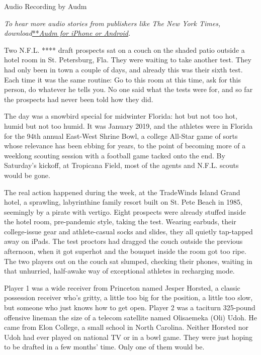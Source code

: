 Audio Recording by Audm

\emph{To hear more audio stories from publishers like The New York
Times,
download}\href{https://www.audm.com/?utm_source=nytmag\&utm_medium=embed\&utm_campaign=left_behind_draper}{**}\href{https://www.audm.com/?utm_source=nytmag\&utm_medium=embed\&utm_campaign=athletic_intelligence_measured_gordon}{\emph{Audm
for iPhone or Android}}\emph{.}

Two N.F.L. **** draft prospects sat on a couch on the shaded patio
outside a hotel room in St. Petersburg, Fla. They were waiting to take
another test. They had only been in town a couple of days, and already
this was their sixth test. Each time it was the same routine: Go to this
room at this time, ask for this person, do whatever he tells you. No one
said what the tests were for, and so far the prospects had never been
told how they did.

The day was a snowbird special for midwinter Florida: hot but not too
hot, humid but not too humid. It was January 2019, and the athletes were
in Florida for the 94th annual East-West Shrine Bowl, a college All-Star
game of sorts whose relevance has been ebbing for years, to the point of
becoming more of a weeklong scouting session with a football game tacked
onto the end. By Saturday's kickoff, at Tropicana Field, most of the
agents and N.F.L. scouts would be gone.

The real action happened during the week, at the TradeWinds Island Grand
hotel, a sprawling, labyrinthine family resort built on St. Pete Beach
in 1985, seemingly by a pirate with vertigo. Eight prospects were
already stuffed inside the hotel room, pre-pandemic style, taking the
test. Wearing earbuds, their college-issue gear and athlete-casual socks
and slides, they all quietly tap-tapped away on iPads. The test proctors
had dragged the couch outside the previous afternoon, when it got
superhot and the bouquet inside the room got too ripe. The two players
out on the couch sat slumped, checking their phones, waiting in that
unhurried, half-awake way of exceptional athletes in recharging mode.

Player 1 was a wide receiver from Princeton named Jesper Horsted, a
classic possession receiver who's gritty, a little too big for the
position, a little too slow, but someone who just knows how to get open.
Player 2 was a taciturn 325-pound offensive lineman the size of a
telecom satellite named Olisaemeka (Oli) Udoh. He came from Elon
College, a small school in North Carolina. Neither Horsted nor Udoh had
ever played on national TV or in a bowl game. They were just hoping to
be drafted in a few months' time. Only one of them would be.

